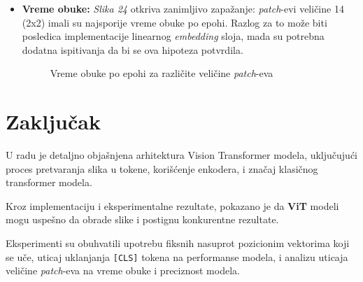 \documentclass[12pt]{article}
\begin{document}
\begin{itemize}
      \newpage
      \item \textbf{Vreme obuke:} \textit{Slika 24} otkriva zanimljivo zapažanje: 
      \textit{patch}-evi veličine 14 (2x2) imali su najsporije vreme obuke po epohi. 
      Razlog za to može biti posledica implementacije linearnog \textit{embedding} sloja, 
      mada su potrebna dodatna ispitivanja da bi se ova hipoteza potvrdila.
      \begin{figure}[h!]
         \centering
         \caption{Vreme obuke po epohi za različite veličine \textit{patch}-eva}
         \label{fig:exp3_time}
      \end{figure}
   \end{itemize}
   \newpage
   \section{Zaključak}

   U radu je detaljno objašnjena arhitektura Vision Transformer modela, uključujući 
   proces pretvaranja slika u tokene, korišćenje enkodera, i značaj klasičnog 
   transformer modela.

   Kroz implementaciju i eksperimentalne rezultate, pokazano je da \textbf{ViT} modeli 
   mogu uspešno da obrade slike i postignu konkurentne rezultate.

   Eksperimenti su obuhvatili upotrebu fiksnih nasuprot pozicionim vektorima koji se uče, 
   uticaj uklanjanja \texttt{[CLS]} tokena na performanse modela, i analizu uticaja 
   veličine \textit{patch}-eva na vreme obuke i preciznost modela.
\end{document}
